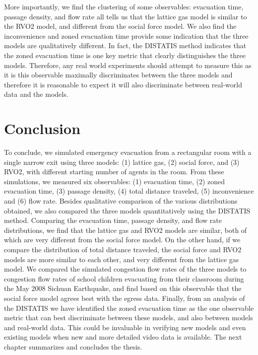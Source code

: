 More importantly, we find the clustering of some observables: evacuation time, passage density, and flow rate all tells us that the lattice gas model is similar to the RVO2 model, and different from the social force model. We also find the inconvenience and zoned evacuation time provide some indication that the three models are qualitatively different. In fact, the DISTATIS method indicates that the zoned evacuation time is one key metric that clearly distinguishes the three models. Therefore, any real world experiments should attempt to measure this as it is this observable maximally discriminates between the three models and therefore it is reasonable to expect it will also discriminate between real-world data and the models.

\section{Conclusion}
\label{Conclusions}

To conclude, we simulated emergency evacuation from a rectangular room with a single narrow exit using three models: (1) lattice gas, (2) social force, and (3) RVO2, with different starting number of agents in the room. From these simulations, we measured six observables: (1) evacuation time, (2) zoned evacuation time, (3) passage density, (4) total distance traveled, (5) inconvenience and (6) flow rate. Besides qualitative comparison of the various distributions obtained, we also compared the three models quantitatively using the DISTATIS method. Comparing the evacuation time, passage density, and flow rate distributions, we find that the lattice gas and RVO2 models are similar, both of which are very different from the social force model. On the other hand, if we compare the distribution of total distance traveled, the social force and RVO2 models are more similar to each other, and very different from the lattice gas model. We compared the simulated congestion flow rates of the three models to congestion flow rates of school children evacuating from their classroom during the May 2008 Sichuan Earthquake, and find based on this observable that the social force model agrees best with the egress data. Finally, from an analysis of the DISTATIS we have identified the zoned evacuation time as the one observable metric that can best discriminate between these models, and also between models and real-world data. This could be invaluable in verifying new models and even existing models when new and more detailed video data is available.
The next chapter summarizes and concludes the thesis.